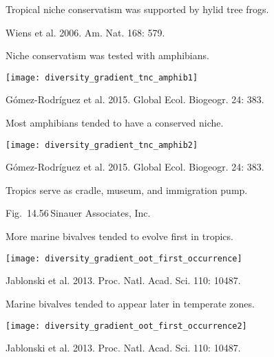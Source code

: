 \documentclass[t]{beamer}
\begin{document}
{
\begin{frame}[b]{Tropical niche conservatism was supported by hylid tree frogs.}


 \tiny \hfill Wiens et al. 2006. Am. Nat. 168: 579.
\end{frame}
}
%
\begin{frame}[t]{Niche conservatism was tested with amphibians.}
	\begin{center}
		\texttt{[image: diversity\_gradient\_tnc\_amphib1]}
	\end{center}
	
	\vfilll
	
	\hfill \tiny Gómez-Rodríguez et al. 2015. Global Ecol. Biogeogr. 24: 383.
\end{frame}
%
\begin{frame}[t,plain]{Most amphibians tended to have a conserved niche.}
	\begin{center}
		\texttt{[image: diversity\_gradient\_tnc\_amphib2]}
	\end{center}
	
	\vfilll
	
	\tiny \hfill Gómez-Rodríguez et al. 2015. Global Ecol. Biogeogr. 24: 383.
\end{frame}
%
{
\begin{frame}[t]{Tropics serve as cradle, museum, and immigration pump.}


	\vfilll

	\tiny \hfill Fig.~14.56\,\textcopyright Sinauer Associates, Inc.
\end{frame}
}
%
\begin{frame}[t]{More marine bivalves tended to evolve first in tropics.}
	\begin{center}
		\texttt{[image: diversity\_gradient\_oot\_first\_occurrence]}
	\end{center}
	
	\vfilll
	
	\hfill \tiny Jablonski et al. 2013. Proc. Natl. Acad. Sci. 110: 10487.
\end{frame}
%
\begin{frame}[t]{Marine bivalves tended to appear later in temperate zones.}
	\vspace{-\baselineskip}
	\begin{center}
		\texttt{[image: diversity\_gradient\_oot\_first\_occurrence2]}
	\end{center}
	
	\vfilll
	
	\hfill \tiny Jablonski et al. 2013. Proc. Natl. Acad. Sci. 110: 10487.
\end{frame}
%
\end{document}
